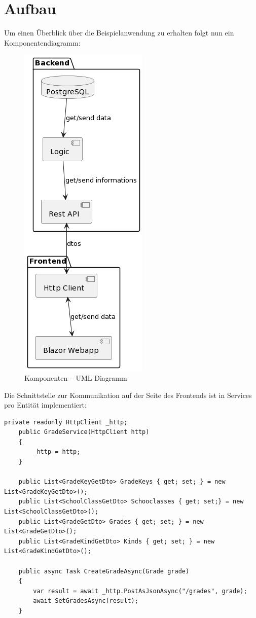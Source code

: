 \section{Aufbau}

Um einen Überblick über die Beispielanwendung zu erhalten folgt nun ein Komponentendiagramm:

\begin{figure}[H]
    \centering
    \includegraphics[scale=0.5]{pics/KomponentenDiagramm.png}
    \caption{Komponenten -- UML Diagramm}
    \label{fig:impl:KomponentenDiagramm}
\end{figure}

Die Schnittstelle zur Kommunikation auf der Seite des Frontends ist in Services pro Entität implementiert:

\begin{lstlisting}[language={[Sharp]C}, caption=Services für Kommunikation, label=lst:imp:service]
    private readonly HttpClient _http;
    public GradeService(HttpClient http)
    {
        _http = http;
    }

    public List<GradeKeyGetDto> GradeKeys { get; set; } = new List<GradeKeyGetDto>();
    public List<SchoolClassGetDto> Schooclasses { get; set;} = new List<SchoolClassGetDto>();
    public List<GradeGetDto> Grades { get; set; } = new List<GradeGetDto>();
    public List<GradeKindGetDto> Kinds { get; set; } = new List<GradeKindGetDto>();
    
    public async Task CreateGradeAsync(Grade grade)
    {
        var result = await _http.PostAsJsonAsync("/grades", grade);
        await SetGradesAsync(result);
    }
\end{lstlisting}

